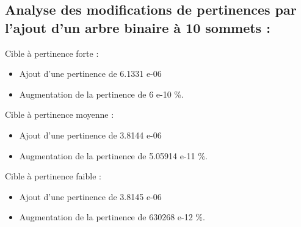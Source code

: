 \documentclass[a4paper,11pt]{article}
\begin{document}
		\subsection{Analyse des modifications de pertinences par l'ajout d'un arbre binaire à 10 sommets :}
		Cible à pertinence forte :
		\begin{itemize} 	
			\item Ajout d'une pertinence de 6.1331 e-06
			\item Augmentation de la pertinence de 6 e-10 \%.
		\end{itemize}
		Cible à pertinence moyenne :
		\begin{itemize} 	
			\item Ajout d'une pertinence de 3.8144 e-06
			\item Augmentation de la pertinence de 5.05914 e-11 \%.
		\end{itemize}
		Cible à pertinence faible :
		\begin{itemize} 	
			\item Ajout d'une pertinence de 3.8145 e-06
			\item Augmentation de la pertinence de 630268 e-12 \%.
		\end{itemize}

\section{}
\end{document}

